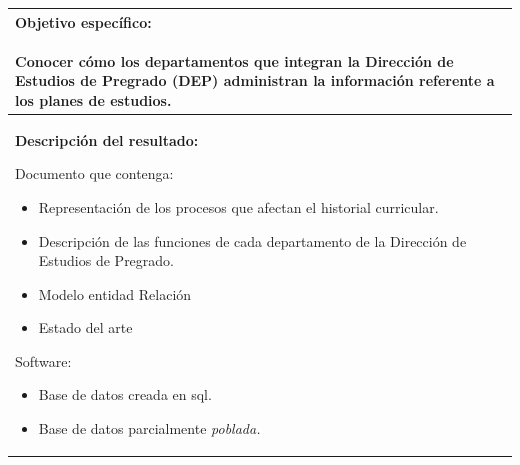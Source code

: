 \documentclass[12pt]{article}
\begin{document}
			\begin{tabular}{ |p{15cm}|} \hline
				 \parbox[c]{15cm}{ {\bf Objetivo específico:}\\ \\Conocer cómo los departamentos que integran la 
				 Dirección de Estudios de Pregrado (DEP) administran la información referente a los planes de estudios.\\} 
			\\
			 \hline
				 \parbox[c]{15cm}{ {\bf Descripción del resultado:}\\ 
				 
				 Documento que contenga: \\
				 \begin{itemize}
				  \item Representación de los procesos que afectan el historial curricular.
				  \item Descripción de las funciones de cada departamento de la Dirección de Estudios de Pregrado.
				  \item Modelo entidad Relación
				  \item Estado del arte
				 \end{itemize}
				  Software: \\
				  \begin{itemize}
				   \item Base de datos creada en sql.
						\item Base de datos parcialmente \textit{poblada.}
				  \end{itemize}

			 
				  } 
			 \\ \hline			 
			 \end{tabular}	
			 \\ \\  \\ 
			 
\end{document}
